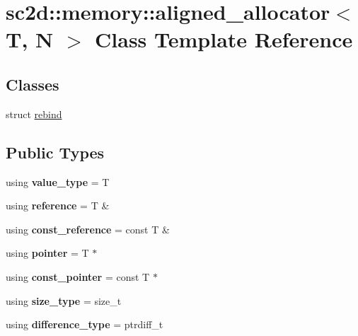 \hypertarget{classsc2d_1_1memory_1_1aligned__allocator}{}\section{sc2d\+:\+:memory\+:\+:aligned\+\_\+allocator$<$ T, N $>$ Class Template Reference}
\label{classsc2d_1_1memory_1_1aligned__allocator}
\subsection*{Classes}
\begin{DoxyCompactItemize}
\item 
struct \hyperlink{structsc2d_1_1memory_1_1aligned__allocator_1_1rebind}{rebind}
\end{DoxyCompactItemize}
\subsection*{Public Types}
\begin{DoxyCompactItemize}
\item 
\mbox{\label{classsc2d_1_1memory_1_1aligned__allocator_a7e9544ebe3eb593df8284851c84d8315}} 
using {\bfseries value\+\_\+type} = T
\item 
\mbox{\label{classsc2d_1_1memory_1_1aligned__allocator_a119bdc564c328a947c7f48c8a74c7748}} 
using {\bfseries reference} = T \&
\item 
\mbox{\label{classsc2d_1_1memory_1_1aligned__allocator_a9f056691a2e1f7b89fab25068753a8cf}} 
using {\bfseries const\+\_\+reference} = const T \&
\item 
\mbox{\label{classsc2d_1_1memory_1_1aligned__allocator_a8df04c7b694d1ef7b639556065b57622}} 
using {\bfseries pointer} = T $\ast$
\item 
\mbox{\label{classsc2d_1_1memory_1_1aligned__allocator_a44f9e1a4d5b0c7962635108ee9cc7bef}} 
using {\bfseries const\+\_\+pointer} = const T $\ast$
\item 
\mbox{\label{classsc2d_1_1memory_1_1aligned__allocator_a798289bfbc510a192c5db9bfc61bda44}} 
using {\bfseries size\+\_\+type} = size\+\_\+t
\item 
\mbox{\label{classsc2d_1_1memory_1_1aligned__allocator_afa4299d8c782bfdc6b2752762ec238aa}} 
using {\bfseries difference\+\_\+type} = ptrdiff\+\_\+t
\end{DoxyCompactItemize}
